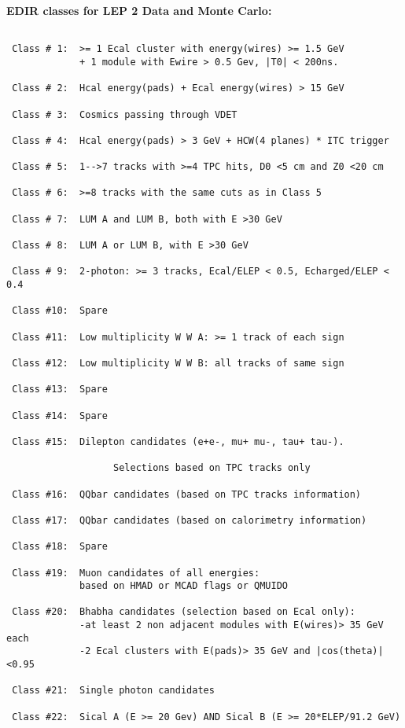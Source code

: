 \bf{EDIR classes for LEP 2 Data and Monte Carlo:}
\par
\begin{verbatim}
 
 Class # 1:  >= 1 Ecal cluster with energy(wires) >= 1.5 GeV
             + 1 module with Ewire > 0.5 Gev, |T0| < 200ns.
 
 Class # 2:  Hcal energy(pads) + Ecal energy(wires) > 15 GeV
 
 Class # 3:  Cosmics passing through VDET
 
 Class # 4:  Hcal energy(pads) > 3 GeV + HCW(4 planes) * ITC trigger
 
 Class # 5:  1-->7 tracks with >=4 TPC hits, D0 <5 cm and Z0 <20 cm
 
 Class # 6:  >=8 tracks with the same cuts as in Class 5
 
 Class # 7:  LUM A and LUM B, both with E >30 GeV
 
 Class # 8:  LUM A or LUM B, with E >30 GeV
 
 Class # 9:  2-photon: >= 3 tracks, Ecal/ELEP < 0.5, Echarged/ELEP < 0.4
 
 Class #10:  Spare
 
 Class #11:  Low multiplicity W W A: >= 1 track of each sign
 
 Class #12:  Low multiplicity W W B: all tracks of same sign
 
 Class #13:  Spare
 
 Class #14:  Spare
 
 Class #15:  Dilepton candidates (e+e-, mu+ mu-, tau+ tau-).
 
                   Selections based on TPC tracks only
 
 Class #16:  QQbar candidates (based on TPC tracks information)
 
 Class #17:  QQbar candidates (based on calorimetry information)
 
 Class #18:  Spare
 
 Class #19:  Muon candidates of all energies:
             based on HMAD or MCAD flags or QMUIDO
 
 Class #20:  Bhabha candidates (selection based on Ecal only):
             -at least 2 non adjacent modules with E(wires)> 35 GeV each
             -2 Ecal clusters with E(pads)> 35 GeV and |cos(theta)|<0.95
 
 Class #21:  Single photon candidates
 
 Class #22:  Sical A (E >= 20 Gev) AND Sical B (E >= 20*ELEP/91.2 GeV)
 

\end{verbatim}
